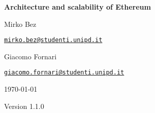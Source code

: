 \begin{titlepage}
  \centering
  \vspace*{4cm}
  {\huge\bfseries Architecture and scalability of Ethereum\par}
  \vspace{1.5cm}
  \begin{minipage}{.47\textwidth}
    \centering
    {\Large Mirko Bez\par}
    \vspace{0.15cm}
    {\texttt{\href{mailto:mirko.bez@studenti.unipd.it}{mirko.bez@studenti.unipd.it}}}
  \end{minipage}
  \hfill
  \begin{minipage}{.47\textwidth}
    \centering
    {\Large Giacomo Fornari\par}
    \vspace{0.15cm}
    {\texttt{\href{mailto:giacomo.fornari@studenti.unipd.it}{giacomo.fornari@studenti.unipd.it}}}
  \end{minipage}
  \par
  \vspace{1cm}
  {\large \today}

  \vfill

  {\large Version 1.1.0}
\end{titlepage}